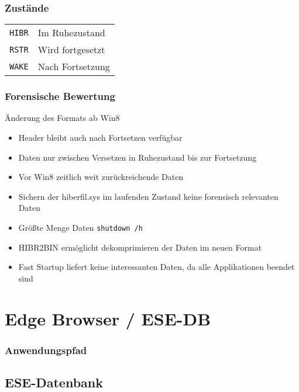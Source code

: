 \subsubsection{Zustände}
\begin{tabular}{@{}p{\the\MyLen}%
		@{}p{\linewidth-\the\MyLen}@{}}
	\texttt{HIBR} & Im Ruhezustand\\
	\texttt{RSTR} & Wird fortgesetzt\\
	\texttt{WAKE} & Nach Fortsetzung\\
\end{tabular}

\subsubsection{Forensische Bewertung}
Änderung des Formats ab Win8
\begin{itemize}[leftmargin=*]
	\item Header bleibt auch nach Fortsetzen verfügbar
	\item Daten nur zwischen Versetzen in Ruhezustand bis zur Fortsetzung
	\item Vor Win8 zeitlich weit zurückreichende Daten
	\item Sichern der hiberfil.sys im laufenden Zustand keine forensisch relevanten Daten
	\item Größte Menge Daten \texttt{shutdown /h}
	\item HIBR2BIN ermöglicht dekomprimieren der Daten im neuen Format
	\item Fast Startup liefert keine interessanten Daten, da alle Applikationen beendet sind
\end{itemize}

\section{Edge Browser / ESE-DB}

\subsubsection{Anwendungspfad}

\subsection{ESE-Datenbank}
